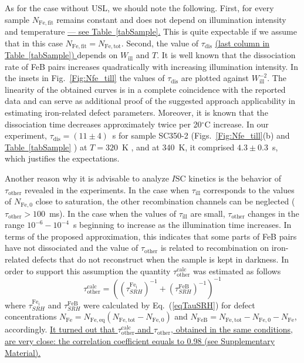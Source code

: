 \documentclass[%
 aip,jap,
 amsmath,amssymb,
 reprint,%
]{revtex4-1}
\begin{document}
As for the case without USL, we should note the following.
First, for every sample $N_\mathrm{Fe,fit}$ remains constant and does not depend on illumination intensity and temperature
\textcolor[rgb]{0.00,0.07,1.00}{\uline{
--- see Table~\ref{tabSample}.}}
This is quite expectable if we assume that
in this case $N_\mathrm{Fe,fit}=N_\mathrm{Fe,tot}$.
Second, the value of $\tau_\mathrm{dis}$
\textcolor[rgb]{0.00,0.07,1.00}{\uline{
(last column in Table~\ref{tabSample})
}}
depends on $W_\mathrm{ill}$ and $T$.
It is well known \cite{Schmidt2019,FeBLight2,FeBKin2019} that the dissociation rate of FeB pairs increases quadratically with increasing illumination intensity.
In the insets in Fig.~\ref{Fig:Nfe_till} the values of $\tau_\mathrm{dis}$
are plotted against $W_\mathrm{ill}^{-2}$.
The linearity of the obtained curves is in a complete coincidence
with the reported data and can serve as additional proof of the suggested approach
applicability in estimating iron-related defect parameters.
Moreover, it is known \cite{Lagowskii1993} that the dissociation time decreases approximately twice per 20$^\circ$C increase.
In our experiment, $\tau_\mathrm{dis}=(11\pm4)$~s for sample SC350-2
(Figs.~\ref{Fig:Nfe_till}(b) and
\textcolor[rgb]{0.00,0.07,1.00}{\uline{
Table~\ref{tabSample}}}
) at $T=320$~K , and at 340~K,
it comprised $4.3\pm0.3$~s, which justifies the expectations.

Another reason why it is advisable to analyze $I\mathrm{SC}$ kinetics is the behavior of
$\tau_\mathrm{other}$ revealed in the experiments.
In the case when $\tau_\mathrm{ill}$ corresponds to the values of $N_\mathrm{Fe,0}$ close to saturation, the other recombination channels  can be neglected ($\tau_\mathrm{other}> 100$~ms).
In the case when the values of $\tau_\mathrm{ill}$ are small,
$\tau_\mathrm{other}$ changes in the range $10^{-6}-10^{-4}$~s beginning to increase as the illumination time increases.
In terms of the proposed approximation, this indicates that some parts of FeB pairs have not dissociated and the value of $\tau_\mathrm{other}$ is related
to recombination on iron-related defects that do not reconstruct when the sample is kept in darkness. In order to support this assumption the quantity
$\tau_\mathrm{other}^\mathrm{calc}$
was estimated as follows
\begin{equation*}
\tau_\mathrm{other}^\mathrm{calc}=\left(\left(\tau_{SRH}^\mathrm{Fe_i}\right)^{-1}
+\left(\tau_{SRH}^\mathrm{FeB}\right)^{-1}\right)^{-1}
\end{equation*}
where
$\tau_{SRH}^\mathrm{Fe_i}$ and $\tau_{SRH}^\mathrm{FeB}$
were calculated by Eq.~(\ref{eqTauSRH}) for defect concentrations
$N_\mathrm{Fe}=N_\mathrm{Fe,eq}(N_\mathrm{Fe,tot}-N_\mathrm{Fe,0})$
and $N_\mathrm{FeB}= N_\mathrm{Fe,tot}-N_\mathrm{Fe,0}- N_\mathrm{Fe}$, accordingly.
 \textcolor[rgb]{0.00,0.07,1.00}{\uline{
It turned out that $\tau_\mathrm{other}^\mathrm{calc}$ and
$\tau_\mathrm{other}$, obtained in the same conditions, are very close:
the correlation coefficient equals to 0.98 (see Supplementary Material).
}}
\end{document}

